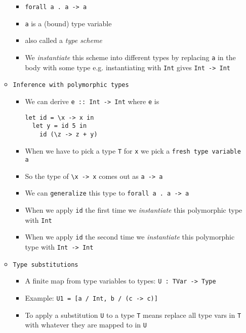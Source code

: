 \documentclass[landscape,8pt]{extarticle}
\newcommand{\code}{\lstinline}
\begin{document}
\begin{multicols}{3}
\begin{itemize}
\begin{itemize}
\begin{itemize}
                            \item \code{forall a . a -> a}
                            \item \code{a} is a (bound) type variable
                            \item also called a \emph{type scheme}
                            \item We \emph{instantiate} this scheme into different types by replacing \code{a} in the body with some type e.g. instantiating with \code{Int} gives \code{Int -> Int}
                        \end{itemize}
                  \item \code{Inference with polymorphic types}
                        \begin{itemize}
                            \item We can derive \code{e :: Int -> Int} where \code{e} is
                                  \begin{lstlisting}
let id = \x -> x in
  let y = id 5 in
    id (\z -> z + y)
\end{lstlisting}
                            \item When we have to pick a type \code{T} for \code{x} we pick a \code{fresh type variable} \code{a}
                            \item So the type of \code{\x -> x} comes out as \code{a -> a}
                            \item We can \code{generalize} this type to \code{forall a . a -> a}
                            \item When we apply \code{id} the first time we \emph{instantiate} this polymorphic type with \code{Int}
                            \item When we apply \code{id} the second time we \emph{instantiate} this polymorphic type with \code{Int -> Int}
                        \end{itemize}
                        \item \code{Type substitutions}
                        \begin{itemize}
                            \item A finite map from type variables to types: \code{U : TVar -> Type}
                            \item Example: \code{U1 = [a / Int, b / (c -> c)]}
                            \item To apply a substitution \code{U} to a type \code{T} means replace all type vars in \code{T} with whatever they are mapped to in \code{U}

\end{itemize}
\end{itemize}
\end{itemize}
\end{multicols}
\end{document}

